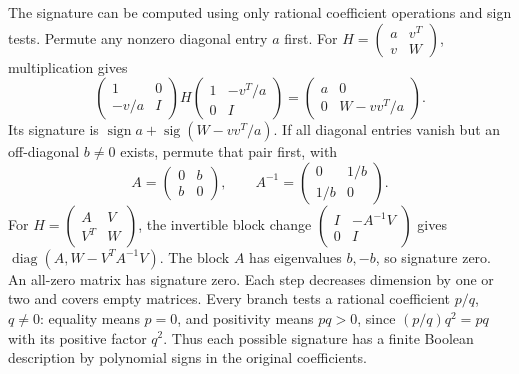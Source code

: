 \documentclass[
  11pt,
]{article}
\begin{document}
The signature can be computed using only rational coefficient operations
and sign tests. Permute any nonzero diagonal entry \(a\) first. For
\(H=\left(\begin{smallmatrix}a&v^T\\v&W\end{smallmatrix}\right)\),
multiplication gives \[
\begin{pmatrix}1&0\\-v/a&I\end{pmatrix}
H\begin{pmatrix}1&-v^T/a\\0&I\end{pmatrix}
=\begin{pmatrix}a&0\\0&W-vv^T/a\end{pmatrix}.
\tag{HP10}
\] Its signature is
\(\operatorname{sign}a+\operatorname{sig}(W-vv^T/a)\). If all diagonal
entries vanish but an off-diagonal \(b\ne0\) exists, permute that pair
first, with \[
A=\begin{pmatrix}0&b\\b&0\end{pmatrix},
\qquad A^{-1}=\begin{pmatrix}0&1/b\\1/b&0\end{pmatrix}.
\tag{HP11}
\] For
\(H=\left(\begin{smallmatrix}A&V\\V^T&W\end{smallmatrix}\right)\), the
invertible block change
\(\left(\begin{smallmatrix}I&-A^{-1}V\\0&I\end{smallmatrix}\right)\)
gives \(\operatorname{diag}(A,W-V^TA^{-1}V)\). The block \(A\) has
eigenvalues \(b,-b\), so signature zero. An all-zero matrix has
signature zero. Each step decreases dimension by one or two and covers
empty matrices. Every branch tests a rational coefficient \(p/q\),
\(q\ne0\): equality means \(p=0\), and positivity means \(pq>0\), since
\((p/q)q^2=pq\) with its positive factor \(q^2\). Thus each possible
signature has a finite Boolean description by polynomial signs in the
original coefficients.
\end{document}
